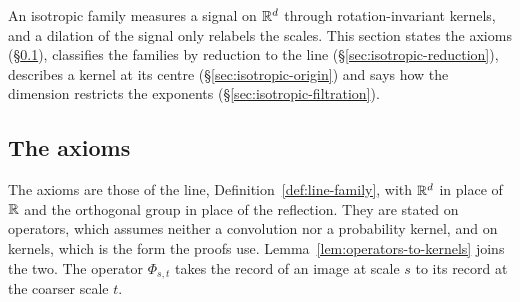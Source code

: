 An isotropic family measures a signal on $\mathbb{R}^d$ through rotation-invariant kernels, and a
dilation of the signal only relabels the scales. This section states the axioms
(\S\ref{sec:isotropic-axioms}), classifies the families by reduction to the line
(\S\ref{sec:isotropic-reduction}), describes a kernel at its centre
(\S\ref{sec:isotropic-origin}) and says how the dimension restricts the exponents
(\S\ref{sec:isotropic-filtration}).

\subsection{The axioms}\label{sec:isotropic-axioms}

The axioms are those of the line, Definition~\ref{def:line-family}, with $\mathbb{R}^d$ in place of $\mathbb{R}$
and the orthogonal group in place of the reflection. They are stated on operators, which assumes
neither a convolution nor a probability kernel, and on kernels, which is the form the proofs use.
Lemma~\ref{lem:operators-to-kernels} joins the two. The operator $\Phi_{s,t}$ takes the record of
an image at scale $s$ to its record at the coarser scale $t$.

